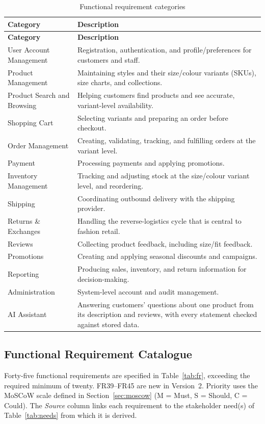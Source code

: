 \documentclass[11pt,a4paper,oneside]{extreport}
\newif\ifshowvtwo
\newcommand{\vtwocolor}{\ifshowvtwo\color{red}\fi}
\newcommand{\upd}[1]{\ifshowvtwo\textcolor{red}{#1}\else#1\fi}
\newcommand{\R}{\leavevmode\vtwocolor}   %
\begin{document}
\begin{xltabular}{\textwidth}{@{}L{4.2cm} Y@{}}
\caption{Functional requirement categories}\label{tab:frcat}\\
\toprule
\textbf{Category} & \textbf{Description} \\ \midrule
\endfirsthead
\toprule
\textbf{Category} & \textbf{Description} \\ \midrule
\endhead
\bottomrule
\endlastfoot
User Account Management & Registration, authentication, and profile/preferences for customers and staff. \\
Product Management & Maintaining styles and their size/colour variants (SKUs), size charts, and collections. \\
Product Search and Browsing & Helping customers find products and see accurate, variant-level availability. \\
Shopping Cart & Selecting variants and preparing an order before checkout. \\
Order Management & Creating, validating, tracking, and fulfilling orders at the variant level. \\
Payment & Processing payments and applying promotions. \\
Inventory Management & Tracking and adjusting stock at the size/colour variant level, and reordering. \\
Shipping & Coordinating outbound delivery with the shipping provider. \\
Returns \& Exchanges & Handling the reverse-logistics cycle that is central to fashion retail. \\
Reviews & Collecting product feedback, including size/fit feedback. \\
Promotions & Creating and applying seasonal discounts and campaigns. \\
Reporting & Producing sales, inventory, and return information for decision-making. \\
Administration & System-level account and audit management. \\
\R AI Assistant & \R Answering customers' questions about one product from its description and reviews, with every statement checked against stored data. \\
\end{xltabular}

\subsection{Functional Requirement Catalogue}
\upd{Forty-five} functional requirements are specified in Table~\ref{tab:fr}, exceeding the required minimum of twenty. \upd{FR39--FR45 are new in Version~2.} Priority uses the MoSCoW scale defined in Section~\ref{sec:moscow} (M = Must, S = Should, C = Could). The \emph{Source} column links each requirement to the stakeholder need(s) of Table~\ref{tab:needs} from which it is derived.
\end{document}
